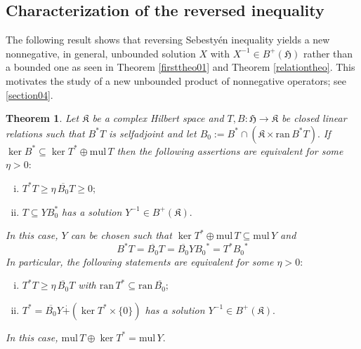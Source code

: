 \documentclass{amsart}
\newtheorem{theorem}{Theorem}[section]
\newcommand{\h}{\mathfrak{H}}
\newcommand{\kk}{\mathfrak{K}}
\newcommand{\mul}{\mathrm{mul} \, }
\newcommand{\ran}{\mathrm{ran}\,}
\newcommand{\adj}{^*}
\newcommand{\inv}{^{-1}}
\newcommand{\tstar}{T^{*}}
\newcommand{\half}{^{\frac{1}{2}}}
\newcommand{\inclu}{\subseteq}
\newcommand{\lplusk}{B^{+}(\kk)}
\newcommand{\lplus}{B^{+}(\h)}
\numberwithin{equation}{section}
\renewcommand{\labelenumi}{(\arabic{enumi})}
\begin{document}
\subsection{Characterization of the reversed inequality} \label{subrelinv}

The following result  shows that reversing Sebestyén inequality yields  a new nonnegative, in general,  unbounded solution $X$ with $X\inv \in \lplus$ rather than a bounded one as seen in Theorem \ref{firsttheo01} and Theorem \ref{relationtheo}. This  motivates the study of a new unbounded product   of nonnegative operators; see \cref{section04}.

\begin{theorem}\label{corsebestyeninclusion}
Let $\kk$ be a complex Hilbert space and $T,B:\h \rightarrow \kk $ be closed linear relations such that $B\adj T$ is selfadjoint and  let  $B_0 := B\adj \cap ( \kk \times \ran B\adj T ).$ If  $\ker B\adj \subseteq \ker T^* \oplus \mul T$ then the following assertions are equivalent for some $\eta > 0:$
   \begin{enumerate}[(i)]\def\labelenumi{\rm(\roman{enumi})}
   \item  $T^* T  \geq \eta  \,  \overline{B_0} T \geq 0;$
     \item $T \inclu Y B_0\adj $ has a solution $Y\inv \in \lplusk.$
      \end{enumerate}
      In this case, $Y$ can be chosen such that $\ker \tstar \oplus \mul T  \inclu \mul Y$ and
      \begin{equation}\label{agosolo}
    B\adj T=  \overline{B_0} T  =  \overline{B_0} Y {B_0}^{*} =  \tstar {B_0}^{*}
      \end{equation}
      In particular, the following statements are equivalent for some $\eta >0:$
   \begin{enumerate}[i)]\def\labelenumi{\rm(\roman{enumi})}\setcounter{enumi}{2}
     \item $T^* T  \geq \eta \,  \overline{B_0} T$ with $\ran{\tstar} \inclu    \ran \overline{B_0};$
     \item $\tstar = \overline{B_0}  Y  \overset{.}{+}  ( \ker \tstar \times \{0\})$ has a solution $Y\inv \in \lplusk.$
      \end{enumerate}
      In this case, $\mul T \oplus \ker \tstar = \mul Y.$
      \end{theorem}
\end{document}
